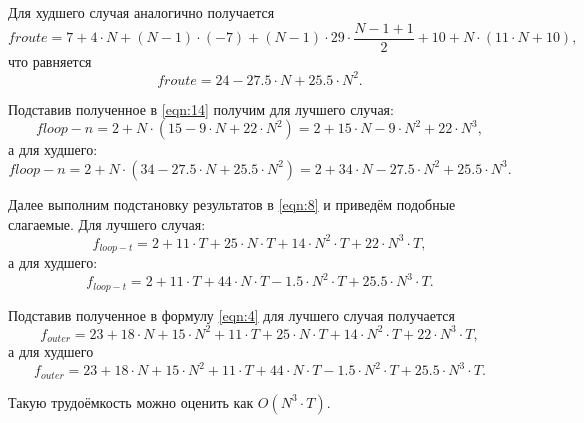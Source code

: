 Для худшего случая аналогично получается
\begin{equation}
	f{route} = 7 + 4 \cdot N + (N-1) \cdot (-7) + (N-1) \cdot 29 \cdot \frac{N - 1 + 1}{2} + 10 + N \cdot (11 \cdot N + 10),
\end{equation}
что равняется 
\begin{equation}
	f{route} = 24 - 27.5 \cdot N + 25.5 \cdot N^2. 
\end{equation}

Подставив полученное в \ref{eqn:14} получим для лучшего случая:
\begin{equation}
	f{loop-n} = 2 + N \cdot (15 - 9 \cdot N + 22 \cdot N^2) = 2 + 15 \cdot N - 9 \cdot N^2 + 22 \cdot N^3,
\end{equation}
а для худшего:
\begin{equation}
	f{loop-n} = 2 + N \cdot (34 - 27.5 \cdot N + 25.5 \cdot N^2) = 2 + 34 \cdot N - 27.5 \cdot N^2 + 25.5 \cdot N^3.
\end{equation}

Далее выполним подстановку результатов в \ref{eqn:8} и приведём подобные слагаемые. Для лучшего случая:
\begin{equation}
	f_{loop-t} = 2 + 11 \cdot T + 25 \cdot N \cdot T + 14 \cdot N^2 \cdot T + 22 \cdot N^3 \cdot T,
\end{equation}
а для худшего:
\begin{equation}
	f_{loop-t} = 2 + 11 \cdot T + 44 \cdot N \cdot T - 1.5 \cdot N^2 \cdot T + 25.5 \cdot N^3 \cdot T.
\end{equation}

Подставив полученное в формулу \ref{eqn:4} для лучшего случая получается
\begin{equation}
	f_{outer} = 23 + 18 \cdot N + 15 \cdot N^2 + 11 \cdot T + 25 \cdot N \cdot T + 14 \cdot N^2 \cdot T + 22 \cdot N^3 \cdot T,
\end{equation}
а для худшего
\begin{equation}
	f_{outer} = 23 + 18 \cdot N + 15 \cdot N^2 + 11 \cdot T + 44 \cdot N \cdot T - 1.5 \cdot N^2 \cdot T + 25.5 \cdot N^3 \cdot T.
\end{equation}

Такую трудоёмкость можно оценить как $O(N^3 \cdot T)$.

\newpage